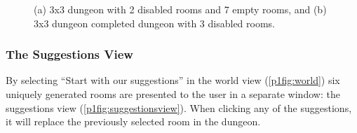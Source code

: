 \begin{figure}[!ht]
    \centering
     \hfill
    
    \caption{(a) 3x3 dungeon with 2 disabled rooms and 7 empty rooms, and (b) 3x3 dungeon completed dungeon with 3 disabled rooms.}
    \label{p1fig:dungeonsp1}
\end{figure}

\subsubsection{The Suggestions View}

By selecting ``Start with our suggestions'' in the world view (\cref{p1fig:world}) six uniquely generated rooms are presented to the user in a separate window: the suggestions view (\cref{p1fig:suggestionsview}). When clicking any of the suggestions, it will replace the previously selected room in the dungeon.

